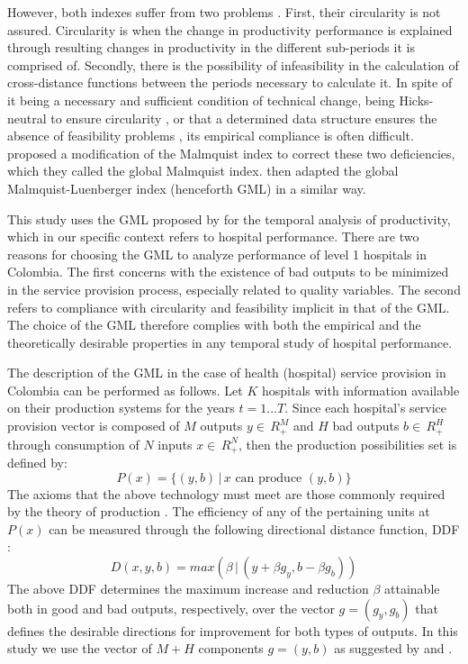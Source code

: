 \documentclass[11pt,a4paper,oneside]{article}
\begin{document}
However, both indexes suffer from two problems \citep{Pastor:2005fb, Oh:2010gf}. First, their circularity is not assured. Circularity is when the change in productivity performance is explained through resulting changes in productivity in the different sub-periods it is comprised of. Secondly, there is the possibility of infeasibility in the calculation of cross-distance functions between the periods necessary to calculate it. In spite of it being a necessary and sufficient condition of technical change, being Hicks-neutral to ensure circularity \citep{Balk:2001es}, or that a determined data structure ensures the absence of feasibility problems \citep{Xue:2002tv}, its empirical compliance is often difficult. \cite{Pastor:2005fb} proposed a modification of the Malmquist index to correct these two deficiencies, which they called the global Malmquist index. \cite{Oh:2010gf} then adapted the global Malmquist-Luenberger index (henceforth GML) in a similar way.


This study uses the GML proposed by \cite{Oh:2010gf} for the temporal analysis of productivity, which in our specific context refers to hospital performance. There are two reasons for choosing the GML to analyze performance of level 1 hospitals in Colombia. The first concerns with the existence of bad outputs to be minimized in the service provision process, especially related to quality variables. The second refers to compliance with circularity and feasibility implicit in that of the GML. The choice of the GML therefore complies with both the empirical and the theoretically desirable properties in any temporal study of hospital performance. 


The description of the GML in the case of health (hospital) service provision in Colombia can be performed as follows. Let $K$ hospitals with information available on their production systems for the years $t=1...T$. Since each hospital's service provision vector is composed of $M$ outputs $y\in\,R^{M}_{+}$ and $H$ bad outputs $b\in\,R_{+}^{H}$ through consumption of $N$ inputs $x\in\,R_{+}^{N}$, then the production possibilities set is defined by:
%
\begin{equation}\label{pps}
P(x)=\{(y,b)\,|\,x \,\, \text{can produce} \,\, (y,b) \}
\end{equation}
%
The axioms that the above technology must meet are those commonly required by the theory of production \citep{Fare:2007fg}. The efficiency of any of the pertaining units at $P(x)$ can be measured through the following directional distance function, DDF \citep{Luenberger:1992kh, Sueyoshi:2010tc, Oh:2010gf}:
%
\begin{equation}\label{ddf}
D\left(x,y,b\right)=max\left(\beta \, |\, \left(y+\beta g_{y},b-\beta g_{b}\right)\right)
\end{equation}
%
The above DDF determines the maximum increase and reduction $\beta$ attainable both in good and bad outputs, respectively, over the vector $g=(g_{y},g_{b})$  that defines the desirable directions for improvement for both types of outputs. In this study we use the vector of ${M+H}$ components $g=(y,b)$ as suggested by \cite{Chung:1997cz} and \cite{Oh:2010gf}.
\end{document}
